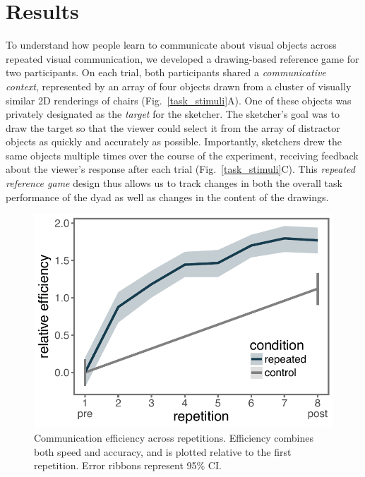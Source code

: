 \documentclass[11pt,letterpaper]{article}
\begin{document}

\section{Results}


To understand how people learn to communicate about visual objects across repeated visual communication, we developed a drawing-based reference game for two participants.
On each trial, both participants shared a \textit{communicative context}, represented by an array of four objects drawn from a cluster of visually similar 2D renderings of chairs (Fig.~\ref{task_stimuli}A).
One of these objects was privately designated as the \emph{target} for the sketcher.
The sketcher's goal was to draw the target so that the viewer could select it from the array of distractor objects as quickly and accurately as possible.
Importantly, sketchers drew the same objects multiple times over the course of the experiment, receiving feedback about the viewer's response after each trial  (Fig.~\ref{task_stimuli}C).
This \emph{repeated reference game} design thus allows us to track changes in both the overall task performance of the dyad as well as changes in the content of the drawings.

\begin{figure}
\begin{center}
\includegraphics[width=0.5\linewidth]{figures/refgame_BIS_timeseries.pdf}
\caption{Communication efficiency across repetitions. Efficiency combines both speed and accuracy, and is plotted relative to the first repetition. Error ribbons represent 95\% CI.}
\label{refgame_bis}
\end{center}
\end{figure}
\end{document}
